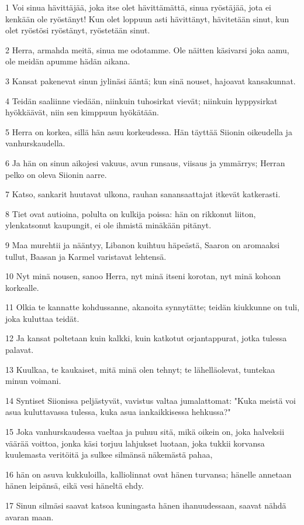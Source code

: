 \par 1 Voi sinua hävittäjää, joka itse olet hävittämättä, sinua ryöstäjää, jota ei kenkään ole ryöstänyt! Kun olet loppuun asti hävittänyt, hävitetään sinut, kun olet ryöstösi ryöstänyt, ryöstetään sinut.
\par 2 Herra, armahda meitä, sinua me odotamme. Ole näitten käsivarsi joka aamu, ole meidän apumme hädän aikana.
\par 3 Kansat pakenevat sinun jylinäsi ääntä; kun sinä nouset, hajoavat kansakunnat.
\par 4 Teidän saaliinne viedään, niinkuin tuhosirkat vievät; niinkuin hyppysirkat hyökkäävät, niin sen kimppuun hyökätään.
\par 5 Herra on korkea, sillä hän asuu korkeudessa. Hän täyttää Siionin oikeudella ja vanhurskaudella.
\par 6 Ja hän on sinun aikojesi vakuus, avun runsaus, viisaus ja ymmärrys; Herran pelko on oleva Siionin aarre.
\par 7 Katso, sankarit huutavat ulkona, rauhan sanansaattajat itkevät katkerasti.
\par 8 Tiet ovat autioina, polulta on kulkija poissa: hän on rikkonut liiton, ylenkatsonut kaupungit, ei ole ihmistä minäkään pitänyt.
\par 9 Maa murehtii ja nääntyy, Libanon kuihtuu häpeästä, Saaron on aromaaksi tullut, Baasan ja Karmel varistavat lehtensä.
\par 10 Nyt minä nousen, sanoo Herra, nyt minä itseni korotan, nyt minä kohoan korkealle.
\par 11 Olkia te kannatte kohdussanne, akanoita synnytätte; teidän kiukkunne on tuli, joka kuluttaa teidät.
\par 12 Ja kansat poltetaan kuin kalkki, kuin katkotut orjantappurat, jotka tulessa palavat.
\par 13 Kuulkaa, te kaukaiset, mitä minä olen tehnyt; te lähelläolevat, tuntekaa minun voimani.
\par 14 Syntiset Siionissa peljästyvät, vavistus valtaa jumalattomat: "Kuka meistä voi asua kuluttavassa tulessa, kuka asua iankaikkisessa hehkussa?"
\par 15 Joka vanhurskaudessa vaeltaa ja puhuu sitä, mikä oikein on, joka halveksii väärää voittoa, jonka käsi torjuu lahjukset luotaan, joka tukkii korvansa kuulemasta veritöitä ja sulkee silmänsä näkemästä pahaa,
\par 16 hän on asuva kukkuloilla, kalliolinnat ovat hänen turvansa; hänelle annetaan hänen leipänsä, eikä vesi häneltä ehdy.
\par 17 Sinun silmäsi saavat katsoa kuningasta hänen ihanuudessaan, saavat nähdä avaran maan.
